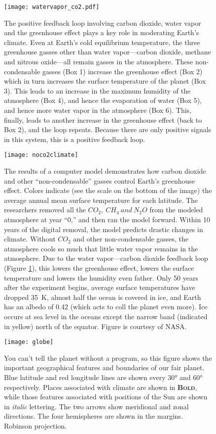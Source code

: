 \begin{figure}[p]
\centering
\texttt{[image: watervapor\_co2.pdf]}%
\caption{The positive feedback loop involving carbon dioxide, water vapor and the greenhouse effect plays a key role in moderating Earth's climate. Even at Earth's cold equilibrium temperature, the three greenhouse gasses other than water vapor---carbon dioxide, methane and nitrous oxide---all remain gasses in the atmosphere. These non-condensable gasses (Box 1) increase the greenhouse effect (Box 2) which in turn increases the surface temperature of the planet (Box 3). This leads to an increase in the maximum humidity of the atmosphere (Box 4), and hence the evaporation of water (Box 5), and hence more water vapor in the atmosphere (Box 6). This, finally, leads to another increase in the greenhouse effect (back to Box 2), and the loop repeats. Because there are only positive signals in this system, this is a positive feedback loop.}   
\label{fig:wvco2}
\end{figure}

\begin{figure}[p]
\centering
\texttt{[image: noco2climate]}%
\caption{The results of a computer model demonstrates how carbon dioxide and other ``non-condensable'' gasses control Earth's greenhouse effect. Colors indicate (see the scale on the bottom of the image) the average annual mean surface temperature for each latitude. The researchers removed all the $CO_2,\ CH_4\ and\ N_2O$ from the modeled atmosphere at year ``0,'' and then ran the model forward. Within 10 years of the digital removal, the model predicts drastic changes in climate. Without $CO_2$ and other non-condensable gasses, the atmosphere cools so much that little water vapor remains in the atmosphere. Due to the water vapor---carbon dioxide feedback loop (Figure \ref{fig:wvco2}), this lowers the greenhouse effect, lowers the surface temperature and lowers the humidity even father. Only 50 years after the experiment begins, average surface temperatures have dropped \SI{35}{\kelvin}, almost half the ocean is covered in ice, and Earth has an albedo of 0.42 (which acts to coll the planet even more). Ice occurs at sea level in the oceans except the narrow band (indicated in yellow) north of the equator. Figure is courtesy of NASA.}   
\label{fig:noco2earth}
\end{figure}

\begin{figure}[p]
\centering
\texttt{[image: globe]}%
\caption{You can't tell the planet without a program, so this figure shows the important geographical features and boundaries of our fair planet. Blue latitude and red longitude lines are shown every $\ang{30}$ and $\ang{60}$ respectively. Places associated with climate are shown in \textbf{\textsc{Bold}}, while those features associated with positions of the Sun are shown in \textit{italic} lettering. The two arrows show meridional and zonal directions. The four hemispheres are shown in the margins. Robinson projection.}   
\label{fig:globe}
\end{figure}



